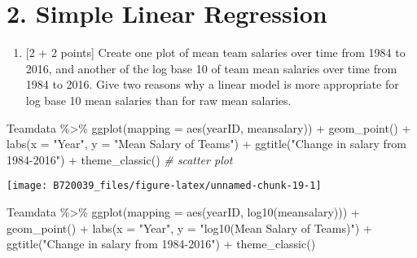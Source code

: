 \documentclass[
]{article}
\newenvironment{Shaded}{\begin{snugshade}}{\end{snugshade}}
\newcommand{\AttributeTok}[1]{\textcolor[rgb]{0.77,0.63,0.00}{#1}}
\newcommand{\CommentTok}[1]{\textcolor[rgb]{0.56,0.35,0.01}{\textit{#1}}}
\newcommand{\FunctionTok}[1]{\textcolor[rgb]{0.00,0.00,0.00}{#1}}
\newcommand{\NormalTok}[1]{#1}
\newcommand{\SpecialCharTok}[1]{\textcolor[rgb]{0.00,0.00,0.00}{#1}}
\newcommand{\StringTok}[1]{\textcolor[rgb]{0.31,0.60,0.02}{#1}}
\providecommand{\tightlist}{%
  \setlength{\itemsep}{0pt}\setlength{\parskip}{0pt}}
\begin{document}
\hypertarget{simple-linear-regression}{%
\section{2. Simple Linear Regression}\label{simple-linear-regression}}

\begin{enumerate}
\def\labelenumi{\alph{enumi}.}
\tightlist
\item
  {[}2 + 2 points{]} Create one plot of mean team salaries over time
  from 1984 to 2016, and another of the log base 10 of team mean
  salaries over time from 1984 to 2016. Give two reasons why a linear
  model is more appropriate for log base 10 mean salaries than for raw
  mean salaries.
\end{enumerate}

\begin{Shaded}
\begin{Highlighting}[]
\NormalTok{Teamdata }\SpecialCharTok{\%\textgreater{}\%}
  \FunctionTok{ggplot}\NormalTok{(}\AttributeTok{mapping =} \FunctionTok{aes}\NormalTok{(yearID, meansalary)) }\SpecialCharTok{+}
  \FunctionTok{geom\_point}\NormalTok{() }\SpecialCharTok{+}
  \FunctionTok{labs}\NormalTok{(}\AttributeTok{x =} \StringTok{"Year"}\NormalTok{, }\AttributeTok{y =} \StringTok{"Mean Salary of Teams"}\NormalTok{) }\SpecialCharTok{+}
  \FunctionTok{ggtitle}\NormalTok{(}\StringTok{"Change in salary from 1984{-}2016"}\NormalTok{) }\SpecialCharTok{+}
  \FunctionTok{theme\_classic}\NormalTok{() }\CommentTok{\# scatter plot}
\end{Highlighting}
\end{Shaded}

\begin{center}\texttt{[image: B720039\_files/figure-latex/unnamed-chunk-19-1]} \end{center}

\begin{Shaded}
\begin{Highlighting}[]
\NormalTok{Teamdata }\SpecialCharTok{\%\textgreater{}\%}
  \FunctionTok{ggplot}\NormalTok{(}\AttributeTok{mapping =} \FunctionTok{aes}\NormalTok{(yearID, }\FunctionTok{log10}\NormalTok{(meansalary))) }\SpecialCharTok{+}
  \FunctionTok{geom\_point}\NormalTok{() }\SpecialCharTok{+}
  \FunctionTok{labs}\NormalTok{(}\AttributeTok{x =} \StringTok{"Year"}\NormalTok{, }\AttributeTok{y =} \StringTok{"log10(Mean Salary of Teams)"}\NormalTok{) }\SpecialCharTok{+}
  \FunctionTok{ggtitle}\NormalTok{(}\StringTok{"Change in salary from 1984{-}2016"}\NormalTok{) }\SpecialCharTok{+}
  \FunctionTok{theme\_classic}\NormalTok{()}
\end{Highlighting}
\end{Shaded}
\end{document}
